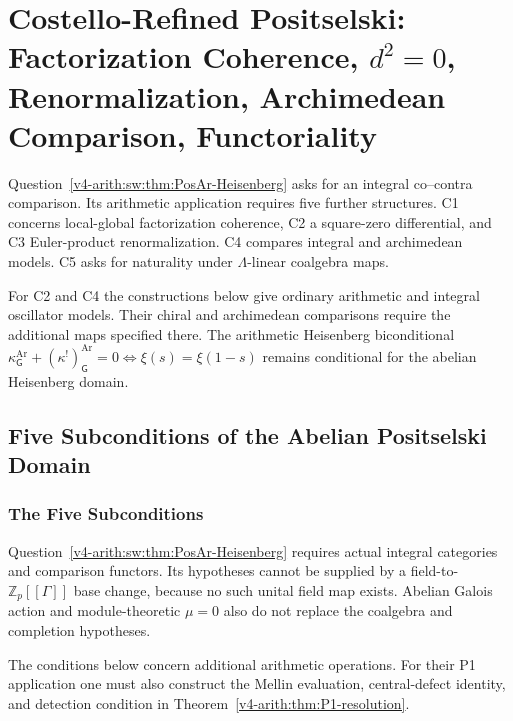\chapter{Costello-Refined Positselski: Factorization Coherence, \(d^{2}=0\), Renormalization, Archimedean Comparison, Functoriality}
\label{v4-arith:pos-costello}

Question~\ref{v4-arith:sw:thm:PosAr-Heisenberg} asks for an
integral co--contra comparison. Its arithmetic application requires
five further structures. C1 concerns local-global factorization
coherence, C2 a square-zero differential, and C3 Euler-product
renormalization. C4 compares integral and archimedean models.
C5 asks for naturality under \(\Lambda\)-linear coalgebra maps.

For C2 and C4 the constructions below give ordinary arithmetic
and integral oscillator models. Their chiral and archimedean
comparisons require the additional maps specified there.
The arithmetic Heisenberg biconditional
\(\kappa^{\mathrm{Ar}}_{\mathsf{G}}+(\kappa^{!})^{\mathrm{Ar}}_{\mathsf{G}}=0\Leftrightarrow\xi(s)=\xi(1-s)\)
remains conditional for the abelian Heisenberg domain.

\section{Five Subconditions of the Abelian Positselski Domain}
\label{v4-arith:pos-costello:five-conditions}

\subsection{The Five Subconditions}

Question~\ref{v4-arith:sw:thm:PosAr-Heisenberg} requires actual
integral categories and comparison functors. Its hypotheses cannot
be supplied by a field-to-\(\mathbb Z_p[[\Gamma]]\) base change,
because no such unital field map exists. Abelian Galois action and
module-theoretic \(\mu=0\) also do not replace the coalgebra and
completion hypotheses.

The conditions below concern additional arithmetic operations.
For their P1 application one must also construct the Mellin
evaluation, central-defect identity, and detection condition in
Theorem~\ref{v4-arith:thm:P1-resolution}.

